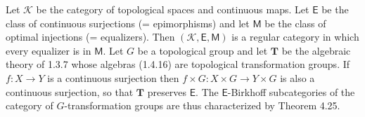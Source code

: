 Let $\mathcal{K}$ be the category of topological spaces and continuous maps. Let $\mathsf{E}$ be the class of continuous surjections (= epimorphisms) and let $\mathsf{M}$ be the class of optimal injections (= equalizers). Then $(\mathcal{K}, \mathsf{E}, \mathsf{M})$ is a regular category in which every equalizer is in $\mathsf{M}$. Let $G$ be a topological group and let $\mathbf{T}$ be the algebraic theory of 1.3.7 whose algebras (1.4.16) are topological transformation groups. If $f: X \longrightarrow Y$ is a continuous surjection then $f \times G: X \times G \longrightarrow Y \times G$ is also a continuous surjection, so that $\mathbf{T}$ preserves $\mathsf{E}$. The $\mathsf{E}$-Birkhoff subcategories of the category of $G$-transformation groups are thus characterized by Theorem 4.25.
